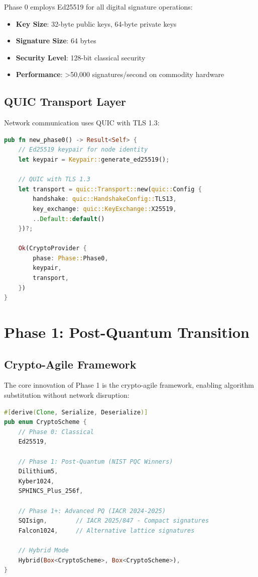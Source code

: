 \documentclass[11pt,a4paper]{article}
\begin{document}
Phase 0 employs Ed25519 for all digital signature operations:

\begin{itemize}
    \item \textbf{Key Size}: 32-byte public keys, 64-byte private keys
    \item \textbf{Signature Size}: 64 bytes
    \item \textbf{Security Level}: 128-bit classical security
    \item \textbf{Performance}: >50,000 signatures/second on commodity hardware
\end{itemize}

\subsection{QUIC Transport Layer}

Network communication uses QUIC with TLS 1.3:

\begin{lstlisting}[language=Rust, caption=Phase 0 QUIC Configuration]
pub fn new_phase0() -> Result<Self> {
    // Ed25519 keypair for node identity
    let keypair = Keypair::generate_ed25519();

    // QUIC with TLS 1.3
    let transport = quic::Transport::new(quic::Config {
        handshake: quic::HandshakeConfig::TLS13,
        key_exchange: quic::KeyExchange::X25519,
        ..Default::default()
    })?;

    Ok(CryptoProvider {
        phase: Phase::Phase0,
        keypair,
        transport,
    })
}
\end{lstlisting}

\section{Phase 1: Post-Quantum Transition}

\subsection{Crypto-Agile Framework}

The core innovation of Phase 1 is the crypto-agile framework, enabling algorithm substitution without network disruption:

\begin{lstlisting}[language=Rust, caption=Crypto-Agile Scheme Selection]
#[derive(Clone, Serialize, Deserialize)]
pub enum CryptoScheme {
    // Phase 0: Classical
    Ed25519,

    // Phase 1: Post-Quantum (NIST PQC Winners)
    Dilithium5,
    Kyber1024,
    SPHINCS_Plus_256f,

    // Phase 1+: Advanced PQ (IACR 2024-2025)
    SQIsign,        // IACR 2025/847 - Compact signatures
    Falcon1024,     // Alternative lattice signatures

    // Hybrid Mode
    Hybrid(Box<CryptoScheme>, Box<CryptoScheme>),
}
\end{lstlisting}
\end{document}
